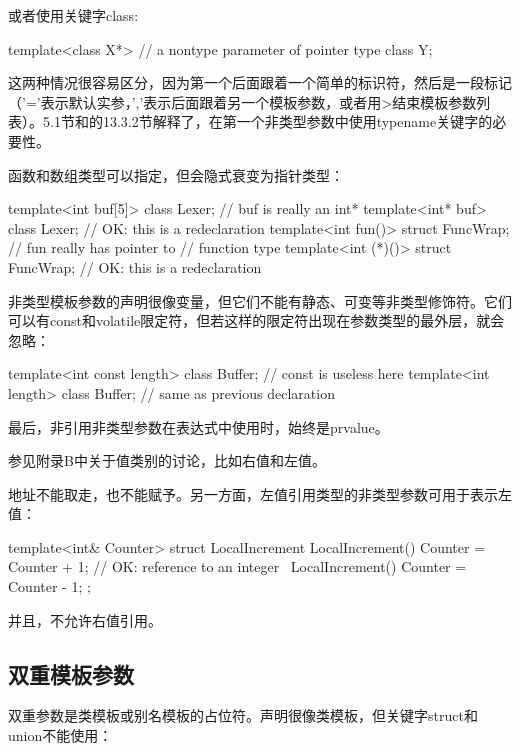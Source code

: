 或者使用关键字class:

\begin{cpp}
template<class X*> // a nontype parameter of pointer type
class Y;
\end{cpp}

这两种情况很容易区分，因为第一个后面跟着一个简单的标识符，然后是一段标记（'='表示默认实参，','表示后面跟着另一个模板参数，或者用>结束模板参数列表）。5.1节和的13.3.2节解释了，在第一个非类型参数中使用typename关键字的必要性。

函数和数组类型可以指定，但会隐式衰变为指针类型：

\begin{cpp}
template<int buf[5]> class Lexer; // buf is really an int*
template<int* buf> class Lexer; // OK: this is a redeclaration
template<int fun()> struct FuncWrap; // fun really has pointer to
								     // function type
template<int (*)()> struct FuncWrap; // OK: this is a redeclaration
\end{cpp}

非类型模板参数的声明很像变量，但它们不能有静态、可变等非类型修饰符。它们可以有const和volatile限定符，但若这样的限定符出现在参数类型的最外层，就会忽略：

\begin{cpp}
template<int const length> class Buffer; // const is useless here
template<int length> class Buffer; // same as previous declaration
\end{cpp}

最后，非引用非类型参数在表达式中使用时，始终是prvalue。 

\begin{notice}
参见附录B中关于值类别的讨论，比如右值和左值。
\end{notice}

地址不能取走，也不能赋予。另一方面，左值引用类型的非类型参数可用于表示左值：

\begin{cpp}
template<int& Counter>
struct LocalIncrement {
	LocalIncrement() { Counter = Counter + 1; } // OK: reference to an integer
	~LocalIncrement() { Counter = Counter - 1; }
};
\end{cpp}

并且，不允许右值引用。

\subsection{双重模板参数}

双重参数是类模板或别名模板的占位符。声明很像类模板，但关键字struct和union不能使用：

